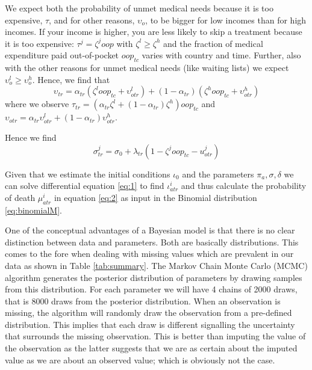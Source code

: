 \documentclass[a4paper,12pt]{article}
\begin{document}
We expect both the probability of unmet medical needs because it is too expensive, \(\tau\), and for other reasons, \(\upsilon_o\), to be bigger for low incomes than for high incomes. If your income is higher, you are less likely to skip a treatment because it is too expensive: \(\tau^j = \zeta^j oop\) with \(\zeta^l \geq \zeta^h\) and the fraction of medical expenditure paid out-of-pocket \(oop_{tc}\) varies with country and time. Further, also with the other reasons for unmet medical needs (like waiting lists) we expect \(\upsilon_o^l \geq \upsilon_o^h\). Hence, we find that
\begin{equation}
\label{eq:Unmet}
\upsilon_{tr} = \alpha_{tr} (\zeta^{l} oop_{tc} + \upsilon_{otr}^l) + (1-\alpha_{tr}) (\zeta^h oop_{tc} + \upsilon_{otr}^{h})
\end{equation}
where we observe \(\tau_{tr} = (\alpha_{tr} \zeta^l + (1-\alpha_{tr}) \zeta^h) oop_{tc}\) and \(\upsilon_{otr} = \alpha_{tr} \upsilon^l_{otr} + (1-\alpha_{tr}) \upsilon^h_{otr}\).

Hence we find
\begin{equation}
\label{eq:sigma}
\sigma_{tr}^{j} = \sigma_{0} + \lambda_{tr} (1-\zeta^j oop_{tc} - u_{otr}^{j})
\end{equation}

Given that we estimate the initial conditions \(\iota_0\) and the parameters \(\pi_a, \sigma, \delta\) we can solve differential equation \eqref{eq:1} to find \(\iota_{atr}^i\) and thus calculate the probability of death \(\mu_{atr}^i\) in equation \eqref{eq:2} as input in the Binomial distribution \eqref{eq:binomialM}.

One of the conceptual advantages of a Bayesian model is that there is no clear distinction between data and parameters. Both are basically distributions. This comes to the fore when dealing with missing values which are prevalent in our data as shown in Table \ref{tab:summary}. The Markov Chain Monte Carlo (MCMC) algorithm generates the posterior distribution of parameters by drawing samples from this distribution. For each parameter we will have 4 chains of 2000 draws, that is 8000 draws from the posterior distribution. When an observation is missing, the algorithm will randomly draw the observation from a pre-defined distribution. This implies that each draw is different signalling the uncertainty that surrounds the missing observation. This is better than imputing the value of the observation as the latter suggests that we are as certain about the imputed value as we are about an observed value; which is obviously not the case.
\end{document}
